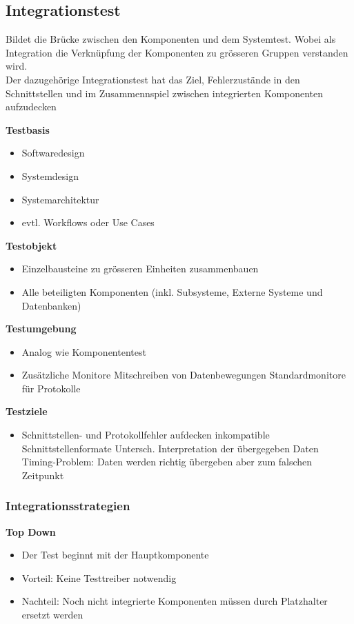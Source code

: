 \documentclass{report}
\theoremstyle{definition}
\theoremstyle{example}
\begin{document}
\subsection{Integrationstest}
Bildet die Brücke zwischen den Komponenten und dem Systemtest. Wobei als Integration die Verknüpfung der Komponenten zu grösseren Gruppen verstanden wird. \\

Der dazugehörige Integrationstest hat das Ziel, Fehlerzustände in den Schnittstellen und im Zusammennspiel zwischen integrierten Komponenten aufzudecken

\textbf{Testbasis}
\begin{itemize}
   \item Softwaredesign
   \item Systemdesign
   \item Systemarchitektur
   \item evtl. Workflows oder Use Cases
\end{itemize}

\textbf{Testobjekt}
\begin{itemize}
   \item Einzelbausteine zu grösseren Einheiten zusammenbauen
   \item Alle beteiligten Komponenten (inkl. Subsysteme, Externe Systeme und Datenbanken)
\end{itemize}

\textbf{Testumgebung}
\begin{itemize}
   \item Analog wie Komponententest
   \item Zusätzliche Monitore
   \subitem Mitschreiben von Datenbewegungen
   \subitem Standardmonitore für Protokolle
\end{itemize}

\textbf{Testziele}
\begin{itemize}
   \item Schnittstellen- und Protokollfehler aufdecken
   \subitem inkompatible Schnittstellenformate
   \subitem Untersch. Interpretation der übergegeben Daten
   \subitem Timing-Problem: Daten werden richtig übergeben aber zum falschen Zeitpunkt
\end{itemize}

\subsubsection{Integrationsstrategien}
\textbf{Top Down}
\begin{itemize}
   \item Der Test beginnt mit der Hauptkomponente
   \item Vorteil: Keine Testtreiber notwendig
   \item Nachteil: Noch nicht integrierte Komponenten müssen durch Platzhalter ersetzt werden
\end{itemize}
\end{document}

